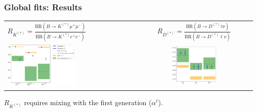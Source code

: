 \documentclass[mathserif, 10pt]{beamer}
\begin{document}
\begin{frame}
\frametitle{Global fits: Results}

\begin{center}
\begin{tabular}{lc}
  $R_{K^{(*)}} = \frac{\mathrm{BR}(B\to K^{(*)}\mu^+ \mu^-)}{\mathrm{BR}(B\to K^{(*)}e^+ e^-)}$ & $R_{D^{(*)}} = \frac{\mathrm{BR}(B\to D^{(*)}\tau \nu)}{\mathrm{BR}(B\to D^{(*)}\ell \nu)}$ \\
  \includegraphics[width=0.55\textwidth]{figures/rotRKplot.pdf}                                 &
  \includegraphics[width=0.4\textwidth]{figures/rotRDplot.pdf}
\end{tabular}
\end{center}
$R_{K^{(*)}}$ requires mixing with the first generation ($\alpha^\ell$).
\end{frame}
\end{document}
